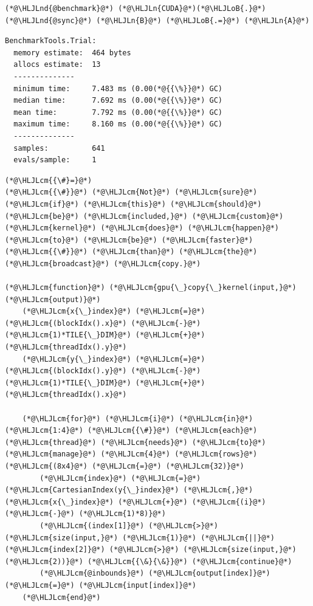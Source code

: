 \documentclass[12pt,a4paper]{article}
\newcommand{\HLJLn}[1]{#1}
\newcommand{\HLJLnd}[1]{\textcolor[RGB]{214,102,97}{#1}}
\newcommand{\HLJLoB}[1]{\textcolor[RGB]{102,102,102}{\textbf{#1}}}
\newcommand{\HLJLcm}[1]{\textcolor[RGB]{153,153,119}{\textit{#1}}}
\begin{document}
\begin{lstlisting}
(*@\HLJLnd{@benchmark}@*) (*@\HLJLn{CUDA}@*)(*@\HLJLoB{.}@*)(*@\HLJLnd{@sync}@*) (*@\HLJLn{B}@*) (*@\HLJLoB{.=}@*) (*@\HLJLn{A}@*)
\end{lstlisting}

\begin{lstlisting}
BenchmarkTools.Trial: 
  memory estimate:  464 bytes
  allocs estimate:  13
  --------------
  minimum time:     7.483 ms (0.00(*@{{\%}}@*) GC)
  median time:      7.692 ms (0.00(*@{{\%}}@*) GC)
  mean time:        7.792 ms (0.00(*@{{\%}}@*) GC)
  maximum time:     8.160 ms (0.00(*@{{\%}}@*) GC)
  --------------
  samples:          641
  evals/sample:     1
\end{lstlisting}


\begin{lstlisting}
(*@\HLJLcm{{\#}=}@*)
(*@\HLJLcm{{\#}}@*) (*@\HLJLcm{Not}@*) (*@\HLJLcm{sure}@*) (*@\HLJLcm{if}@*) (*@\HLJLcm{this}@*) (*@\HLJLcm{should}@*) (*@\HLJLcm{be}@*) (*@\HLJLcm{included,}@*) (*@\HLJLcm{custom}@*) (*@\HLJLcm{kernel}@*) (*@\HLJLcm{does}@*) (*@\HLJLcm{happen}@*) (*@\HLJLcm{to}@*) (*@\HLJLcm{be}@*) (*@\HLJLcm{faster}@*)
(*@\HLJLcm{{\#}}@*) (*@\HLJLcm{than}@*) (*@\HLJLcm{the}@*) (*@\HLJLcm{broadcast}@*) (*@\HLJLcm{copy.}@*)

(*@\HLJLcm{function}@*) (*@\HLJLcm{gpu{\_}copy{\_}kernel(input,}@*) (*@\HLJLcm{output)}@*)
    (*@\HLJLcm{x{\_}index}@*) (*@\HLJLcm{=}@*) (*@\HLJLcm{(blockIdx().x}@*) (*@\HLJLcm{-}@*) (*@\HLJLcm{1)*TILE{\_}DIM}@*) (*@\HLJLcm{+}@*) (*@\HLJLcm{threadIdx().y}@*)
    (*@\HLJLcm{y{\_}index}@*) (*@\HLJLcm{=}@*) (*@\HLJLcm{(blockIdx().y}@*) (*@\HLJLcm{-}@*) (*@\HLJLcm{1)*TILE{\_}DIM}@*) (*@\HLJLcm{+}@*) (*@\HLJLcm{threadIdx().x}@*)
    
    (*@\HLJLcm{for}@*) (*@\HLJLcm{i}@*) (*@\HLJLcm{in}@*) (*@\HLJLcm{1:4}@*) (*@\HLJLcm{{\#}}@*) (*@\HLJLcm{each}@*) (*@\HLJLcm{thread}@*) (*@\HLJLcm{needs}@*) (*@\HLJLcm{to}@*) (*@\HLJLcm{manage}@*) (*@\HLJLcm{4}@*) (*@\HLJLcm{rows}@*) (*@\HLJLcm{(8x4}@*) (*@\HLJLcm{=}@*) (*@\HLJLcm{32)}@*)
        (*@\HLJLcm{index}@*) (*@\HLJLcm{=}@*) (*@\HLJLcm{CartesianIndex(y{\_}index}@*) (*@\HLJLcm{,}@*) (*@\HLJLcm{x{\_}index}@*) (*@\HLJLcm{+}@*) (*@\HLJLcm{(i}@*) (*@\HLJLcm{-}@*) (*@\HLJLcm{1)*8)}@*)
        (*@\HLJLcm{(index[1]}@*) (*@\HLJLcm{>}@*) (*@\HLJLcm{size(input,}@*) (*@\HLJLcm{1)}@*) (*@\HLJLcm{||}@*) (*@\HLJLcm{index[2]}@*) (*@\HLJLcm{>}@*) (*@\HLJLcm{size(input,}@*) (*@\HLJLcm{2))}@*) (*@\HLJLcm{{\&}{\&}}@*) (*@\HLJLcm{continue}@*)
        (*@\HLJLcm{@inbounds}@*) (*@\HLJLcm{output[index]}@*) (*@\HLJLcm{=}@*) (*@\HLJLcm{input[index]}@*)
    (*@\HLJLcm{end}@*)
    

\end{lstlisting}
\end{document}

